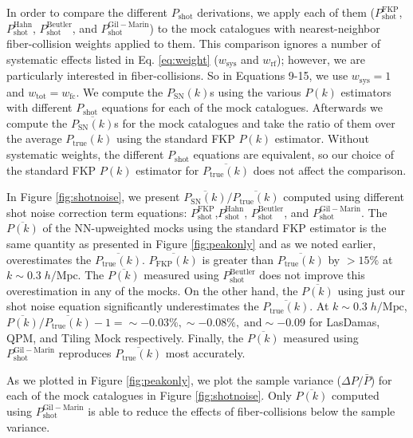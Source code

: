 \documentclass{emulateapj}
\begin{document}
In order to compare the different $P_\mathrm{shot}$ derivations, we apply each of them ($P^\mathrm{FKP}_\mathrm{shot}$,$P^\mathrm{Hahn}_\mathrm{shot}$, $P^\mathrm{Beutler}_\mathrm{shot}$, and $P^\mathrm{Gil-Marin}_\mathrm{shot}$) to the mock catalogues with nearest-neighbor fiber-collision weights applied to them. This comparison ignores a number of systematic effects listed in Eq. \ref{eq:weight} ($w_\mathrm{sys}$ and $w_\mathrm{rf}$); however, we are particularly interested in fiber-collisions. So in Equations 9-15, we use $w_\mathrm{sys} = 1$ and $w_\mathrm{tot} = w_\mathrm{fc}$. We compute the $P_\mathrm{SN}(k)$s using the various $P(k)$ estimators with different $P_\mathrm{shot}$ equations for each of the mock catalogues. Afterwards we compute the $\overline{P_\mathrm{SN}(k)}$s for the mock catalogues and take the ratio of them over the average $P_\mathrm{true}(k)$ using the standard FKP $P(k)$ estimator. Without systematic weights, the different $P_\mathrm{shot}$ equations are equivalent, so our choice of the standard FKP $P(k)$ estimator for $\overline{P_\mathrm{true}(k)}$ does not affect the comparison. 

In Figure \ref{fig:shotnoise}, we present $\overline{P_\mathrm{SN}(k)}/\overline{P_\mathrm{true}(k)}$ computed using different shot noise correction term equations: $P^\mathrm{FKP}_\mathrm{shot}$,$P^\mathrm{Hahn}_\mathrm{shot}$, $P^\mathrm{Beutler}_\mathrm{shot}$, and $P^\mathrm{Gil-Marin}_\mathrm{shot}$. The $\overline{P(k)}$ of the NN-upweighted mocks using the standard FKP estimator is the same quantity as presented in Figure \ref{fig:peakonly} and as we noted earlier, overestimates the $\overline{P_\mathrm{true}(k)}$. $\overline{P_\mathrm{FKP}(k)}$ is greater than $\overline{P_\mathrm{true}(k)}$ by $> 15 \%$ at $k \sim 0.3\; h/\mathrm{Mpc}$. The $\overline{P(k)}$ measured using $P^\mathrm{Beutler}_\mathrm{shot}$ does not improve this overestimation in any of the mocks. On the other hand, the $\overline{P(k)}$ using just our shot noise equation significantly underestimates the $\overline{P_\mathrm{true}(k)}$. At $k \sim 0.3 \; h/\mathrm{Mpc}$, $\overline{P(k)}/\overline{P_\mathrm{true}(k)} - 1 = \sim -0.03 \%, \sim -0.08 \%, \;\mathrm{and} \sim -0.09$ for LasDamas, QPM, and Tiling Mock respectively. Finally, the $\overline{P(k)}$ measured using $P^\mathrm{Gil-Marin}_\mathrm{shot}$ reproduces $\overline{P_\mathrm{true}(k)}$ most accurately. %

As we plotted in Figure \ref{fig:peakonly}, we plot the sample variance ($\Delta P/\bar{P}$) for each of the mock catalogues in Figure \ref{fig:shotnoise}. Only $\overline{P(k)}$ computed using $P^\mathrm{Gil-Marin}_\mathrm{shot}$ is able to reduce the effects of fiber-collisions below the sample variance. 
\end{document}
